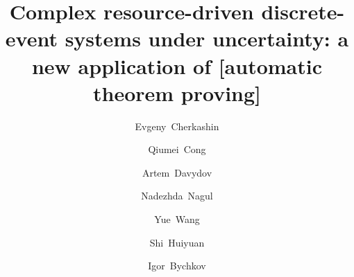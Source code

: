 \documentclass[runningheads]{llncs}
\begin{document}
%
\title{Complex resource-driven discrete-event systems under uncertainty: a new application of [automatic theorem proving]}
%
%
\author{
Evgeny~Cherkashin \and
Qiumei~Cong \and
Artem~Davydov \and
Nadezhda~Nagul \and
Yue~Wang \and
Shi~Huiyuan \and
Igor~Bychkov
}
%
%

\end{document}
